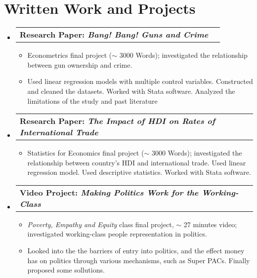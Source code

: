 \documentclass[letterpaper,11pt]{article}
\makeatletter
\newcommand{\resumeItem}[1]{
  \item\small{
    {#1 \vspace{-2pt}}
  }
}
\newcommand{\resumeProjectHeading}[2]{
    \vspace{-2pt}\item
    \begin{tabular*}{0.97\textwidth}{l@{\extracolsep{\fill}}r}
      \small#1 & \small#2 \\
    \end{tabular*}\vspace{-7pt}
}
\newcommand{\resumeSubHeadingListStart}{\begin{itemize}[leftmargin=0.15in, label={}]}
\newcommand{\resumeSubHeadingListEnd}{\end{itemize}}
\newcommand{\resumeItemListStart}{\begin{itemize}}
\newcommand{\resumeItemListEnd}{\end{itemize}\vspace{-5pt}}
\makeatother
\begin{document}
    

      




\section{Written Work and Projects}
    \vspace{3pt}
    \resumeSubHeadingListStart
      
      \resumeProjectHeading
        {\textbf{Research Paper: \textit{Bang! Bang! Guns and Crime}}} {}
          \resumeItemListStart
            \resumeItem{Econometrics final project ($\sim$ 3000 Words); investigated the relationship between gun ownership and crime. }
            \resumeItem{Used linear regression models with multiple control variables. Constructed and cleaned the datasets. Worked with Stata software. Analyzed the limitations of the study and past literature}

            \resumeItemListEnd

      \resumeProjectHeading
      {\textbf{Research Paper: \textit{The Impact of HDI on Rates of International Trade}}} {}
      \resumeItemListStart
          \resumeItem{Statistics for Economics final project ($\sim$ 3000 Words); investigated the relationship between country's HDI and international trade. Used linear regression model. Used descriptive statistics. Worked with Stata software.}
        \resumeItemListEnd
      
        \resumeProjectHeading
        {\textbf{Video Project: \textit{Making Politics Work for the Working-Class}}} {}
        \resumeItemListStart
            \resumeItem{\textit{Poverty, Empathy and Equity} class final project, $\sim$ 27 minutes video; investigated working-class people representation in politics.}
            \resumeItem{Looked into the the barriers of entry into politics, and the effect money has on politics through various mechanisms, such as Super PACs. Finally proposed some sollutions.}
          \resumeItemListEnd
    \resumeSubHeadingListEnd
\end{document}
